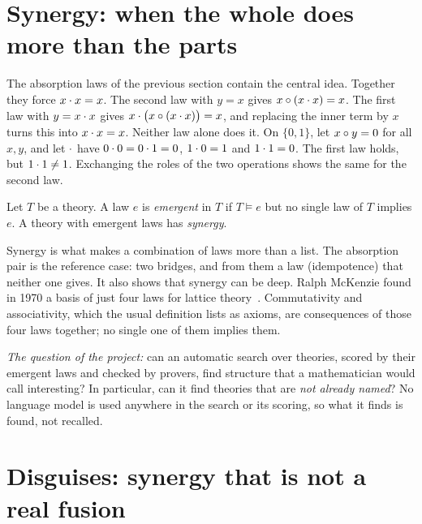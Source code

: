 \documentclass[11pt,a4paper]{article}
\begin{document}
\section{Synergy: when the whole does more than the parts}\label{sec:synergy}

The absorption laws of the previous section contain the central idea. Together
they force $x\cdot x=x$. The second law with $y=x$ gives $x\circ(x\cdot x)=x$. The first law with $y=x\cdot x$ gives
$x\cdot\bigl(x\circ(x\cdot x)\bigr)=x$, and replacing the inner term by $x$ turns this into $x\cdot x=x$. Neither law alone
does it. On $\{0,1\}$, let $x\circ y=0$ for all $x,y$, and let $\cdot$ have $0\cdot0=0\cdot1=0$, $1\cdot0=1$ and $1\cdot1=0$. The first
law holds, but $1\cdot1\neq1$. Exchanging the roles of the two operations shows the same for the second law.

\begin{definition}
Let $T$ be a theory. A law $e$ is \emph{emergent} in $T$ if $T\models e$ but no single law of $T$ implies $e$. A
theory with emergent laws has \emph{synergy}.
\end{definition}

Synergy is what makes a combination of laws more than a list. The absorption pair is the reference case: two
bridges, and from them a law (idempotence) that neither one gives. It also shows that synergy can be deep. Ralph
McKenzie found in 1970 a basis of just four laws for lattice theory~\cite{mckenzie1970}. Commutativity and
associativity, which the usual definition lists as axioms, are consequences of those four laws together; no single
one of them implies them.

\emph{The question of the project:} can an automatic search over theories, scored by their emergent laws and checked
by provers, find structure that a mathematician would call interesting? In particular, can it find theories that are
\emph{not already named}? No language model is used anywhere in the search or its scoring, so what it finds is
found, not recalled.


\section{Disguises: synergy that is not a real fusion}
\end{document}
